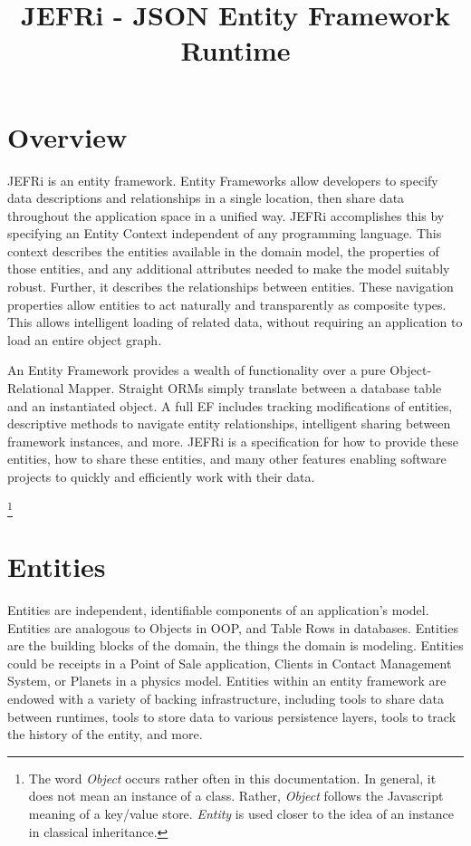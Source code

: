 \documentclass{article}
\begin{document}
\title{JEFRi - JSON Entity Framework Runtime}
\maketitle
\tableofcontents
\newpage
\linespread{1.6}

\section{Overview}

JEFRi is an entity framework. Entity Frameworks allow developers to specify
data descriptions and relationships in a single location, then share data throughout
the application space in a unified way. JEFRi accomplishes this by specifying
an Entity Context independent of any programming language. This context
describes the entities available in the domain model, the properties of those
entities, and any additional attributes needed to make the model suitably
robust. Further, it describes the relationships between entities. These
navigation properties allow entities to act naturally and transparently as
composite types. This allows intelligent loading of related data, without
requiring an application to load an entire object graph.

An Entity Framework provides a wealth of functionality over a pure
Object-Relational Mapper. Straight ORMs simply translate between a database
table and an instantiated object. A full EF includes tracking modifications
of entities, descriptive methods to navigate entity relationships, intelligent
sharing between framework instances, and more. JEFRi is a specification for how
to provide these entities, how to share these entities, and many other features
enabling software projects to quickly and efficiently work with their data.

\footnote{The word {\sl Object} occurs rather often in this documentation. In
general, it does not mean an instance of a class. Rather, {\sl Object} follows
the Javascript meaning of a key/value store. {\sl Entity} is used closer to
the idea of an instance in classical inheritance.}

\section{Entities}

Entities are independent, identifiable components of an application's model.
Entities are analogous to Objects in OOP, and Table Rows in databases. Entities
are the building blocks of the domain, the things the domain is modeling.
Entities could be receipts in a Point of Sale application, Clients in Contact
Management System, or Planets in a physics model. Entities within an entity
framework are endowed with a variety of backing infrastructure, including tools
to share data between runtimes, tools to store data to various persistence
layers, tools to track the history of the entity, and more.
\end{document}
